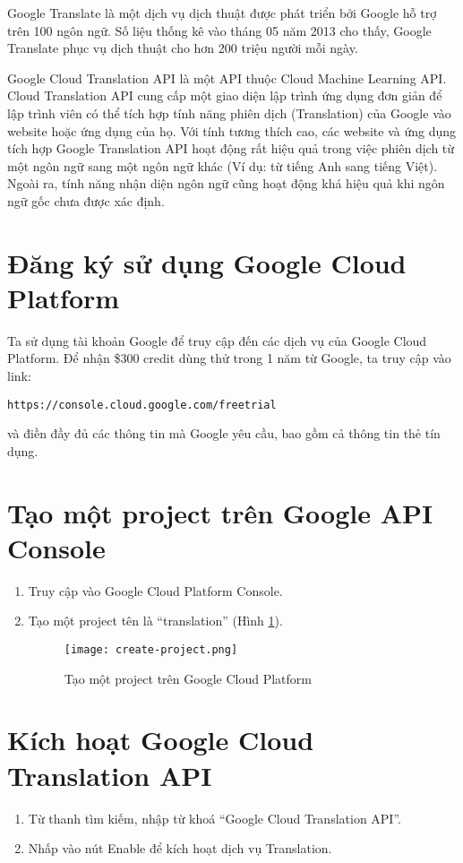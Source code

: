 \documentclass[../thesis.tex]{subfiles}
\begin{document}
Google Translate là một dịch vụ dịch thuật được phát triển bởi Google hỗ trợ trên 100 ngôn ngữ. Số liệu thống kê vào tháng 05 năm 2013 cho thấy, Google Translate phục vụ dịch thuật cho hơn 200 triệu người mỗi ngày.

Google Cloud Translation API là một API thuộc Cloud Machine Learning API. Cloud Translation API cung cấp một giao diện lập trình ứng dụng đơn giản để lập trình viên có thể tích hợp tính năng phiên dịch (Translation) của Google vào website hoặc ứng dụng của họ. Với tính tương thích cao, các website và ứng dụng tích hợp Google Translation API hoạt động rất hiệu quả trong việc phiên dịch từ một ngôn ngữ sang một ngôn ngữ khác (Ví dụ: từ tiếng Anh sang tiếng Việt). Ngoài ra, tính năng nhận diện ngôn ngữ cũng hoạt động khá hiệu quả khi ngôn ngữ gốc chưa được xác định.

\section{Đăng ký sử dụng Google Cloud Platform}
Ta sử dụng tài khoản Google để truy cập đến các dịch vụ của Google Cloud Platform. Để nhận \$300 credit dùng thử trong 1 năm từ Google, ta truy cập vào link:
\begin{lstlisting}[numbers=none, frame=none,xleftmargin=0cm]
https://console.cloud.google.com/freetrial
\end{lstlisting}
và điền đầy đủ các thông tin mà Google yêu cầu, bao gồm cả thông tin thẻ tín dụng.

\section{Tạo một project trên Google API Console}
\begin{enumerate}
	\item Truy cập vào Google Cloud Platform Console.
	\item Tạo một project tên là ``translation'' (Hình \ref{Tạo một project trên Google Cloud Platform}).
	\begin{figure}
		\texttt{[image: create-project.png]}
		\caption{Tạo một project trên Google Cloud Platform}
		\label{Tạo một project trên Google Cloud Platform}
	\end{figure}
\end{enumerate}

\section{Kích hoạt Google Cloud Translation API}
\begin{enumerate}
	\item Từ thanh tìm kiếm, nhập từ khoá ``Google Cloud Translation API''.
	\item Nhấp vào nút Enable để kích hoạt dịch vụ Translation.
\end{enumerate}
\end{document}
